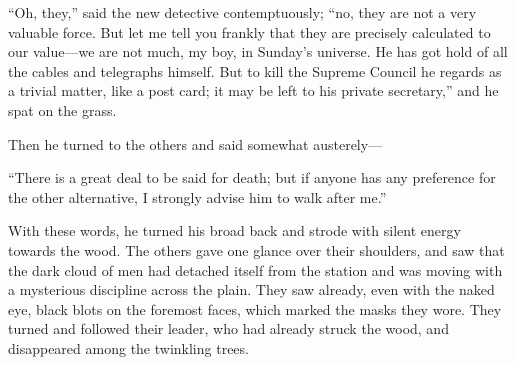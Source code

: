 \documentclass{book}
\begin{document}
“Oh, they,” said the new detective contemptuously; “no, they are not a very valuable force. But let me tell you frankly that they are precisely calculated to our value—we are not much, my boy, in Sunday’s universe. He has got hold of all the cables and telegraphs himself. But to kill the Supreme Council he regards as a trivial matter, like a post card; it may be left to his private secretary,” and he spat on the grass.

Then he turned to the others and said somewhat austerely—

“There is a great deal to be said for death; but if anyone has any preference for the other alternative, I strongly advise him to walk after me.”

With these words, he turned his broad back and strode with silent energy towards the wood. The others gave one glance over their shoulders, and saw that the dark cloud of men had detached itself from the station and was moving with a mysterious discipline across the plain. They saw already, even with the naked eye, black blots on the foremost faces, which marked the masks they wore. They turned and followed their leader, who had already struck the wood, and disappeared among the twinkling trees.
\end{document}
